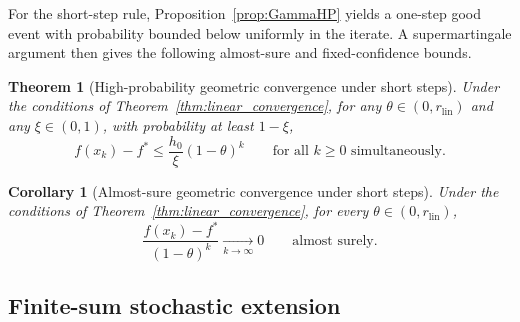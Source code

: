 \documentclass{article}
\newtheorem{theorem}{Theorem}
\newtheorem{corollary}{Corollary}
\begin{document}
For the short-step rule, Proposition~\ref{prop:GammaHP} yields a one-step good event with probability bounded below uniformly in the iterate. A supermartingale argument then gives the following almost-sure and fixed-confidence bounds.

\begin{theorem}[High-probability geometric convergence under short steps]
\label{thm:hp_linear}
Under the conditions of Theorem~\ref{thm:linear_convergence}, for any $\theta\in(0,r_{\mathrm{lin}})$ and any $\xi \in(0,1)$, with probability at least $1-\xi$,
\begin{equation}
f(x_k)-f^*\le \frac{h_0}{\xi}(1-\theta)^k
\qquad\text{for all }k\ge 0\text{ simultaneously.}
\label{eq:hp_linear}
\end{equation}
\end{theorem}

\begin{corollary}[Almost-sure geometric convergence under short steps]
\label{cor:as_linear}
Under the conditions of Theorem~\ref{thm:linear_convergence}, for every $\theta\in(0,r_{\mathrm{lin}})$,
\begin{equation}
\frac{f(x_k)-f^*}{(1-\theta)^k}\xrightarrow[k\to\infty]{}0
\qquad\text{almost surely.}
\label{eq:as_linear_rate}
\end{equation}
\end{corollary}

\subsection{Finite-sum stochastic extension}\label{sec:stoch}
\end{document}
